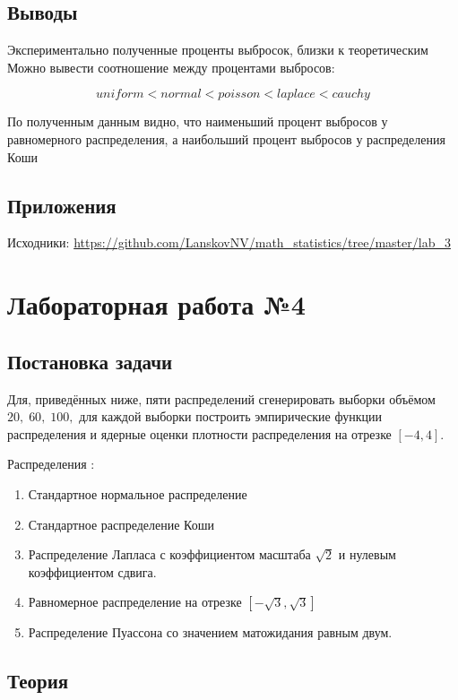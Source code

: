 \documentclass[12pt]{report}
\begin{document}
\section{Выводы}
\par Экспериментально полученные проценты выбросок, близки к теоретическим
Можно вывести соотношение между процентами выбросов:

\begin{equation}
uniform<normal<poisson<laplace<cauchy
\end{equation}

\par По полученным данным видно, что наименьший процент выбросов у равномерного распределения, а наибольший процент выбросов у распределения Коши

\section{Приложения}

Исходники: \url{https://github.com/LanskovNV/math_statistics/tree/master/lab_3}


\chapter{Лабораторная работа №4}
\section{Постановка задачи}

Для, приведённых ниже, пяти распределений сгенерировать выборки объёмом $20,\; 60,\; 100,$ для каждой выборки построить эмпирические функции распределения и ядерные оценки плотности распределения на отрезке $[-4, 4].$

Распределения \cite{distr_formulas}:
\begin{enumerate}
\item Стандартное нормальное распределение
\item Стандартное распределение Коши
\item Распределение Лапласа с коэффициентом масштаба $\sqrt{2}$ и нулевым коэффициентом сдвига.
\item Равномерное распределение на отрезке $\left[-\sqrt{3}, \sqrt{3}\right]$
\item Распределение Пуассона со значением матожидания равным двум.
\end{enumerate}

\section{Теория}
\end{document}
